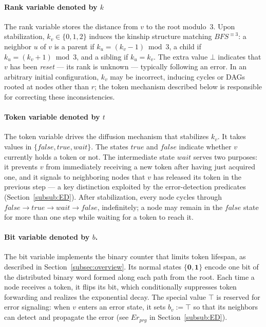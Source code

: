 \documentclass[a4paper, 12pt]{article}
\newcommand{\bz}{\mathbf{0}}
\newcommand{\bo}{\mathbf{1}}
\newcommand{\rk}{k}
\begin{document}
\paragraph*{Rank variable denoted by $\rk$}
The rank variable stores the distance from $v$ to the root modulo~$3$. Upon stabilization, $\rk_v \in \{0,1,2\}$ induces the kinship structure matching $BFS^{\equiv 3}$: a neighbor $u$ of $v$ is a parent if $\rk_u = (\rk_v - 1) \bmod 3$, a child if $\rk_u = (\rk_v + 1) \bmod 3$, and a sibling if $\rk_u = \rk_v$. The extra value $\bot$ indicates that $v$ has been \emph{reset} — its rank is unknown — typically following an error. In an arbitrary initial configuration, $\rk_v$ may be incorrect, inducing cycles or DAGs rooted at nodes other than $r$; the token mechanism described below is responsible for correcting these inconsistencies.

\paragraph*{Token variable denoted by $t$}
The token variable drives the diffusion mechanism that stabilizes $\rk_v$. It takes values in $\{\mathit{false}, \mathit{true}, \mathit{wait}\}$. The states $\mathit{true}$ and $\mathit{false}$ indicate whether $v$ currently holds a token or not. The intermediate state $\mathit{wait}$ serves two purposes: it prevents $v$ from immediately receiving a new token after having just acquired one, and it signals to neighboring nodes that $v$ has released its token in the previous step — a key distinction exploited by the error-detection predicates (Section~\ref{subsub:ED}). After stabilization, every node cycles through $\mathit{false} \to \mathit{true} \to \mathit{wait} \to \mathit{false}$, indefinitely; a node may remain in the $\mathit{false}$ state for more than one step while waiting for a token to reach it.

\paragraph*{Bit variable denoted by $b$.}
The bit variable implements the binary counter that limits token lifespan, as described in Section~\ref{subsec:overview}. Its normal states $\{\bz, \bo\}$ encode one bit of the distributed binary word formed along each path from the root. Each time a node receives a token, it flips its bit, which conditionally suppresses token forwarding and realizes the exponential decay. The special value $\top$ is reserved for error signaling: when $v$ enters an error state, it sets $b_v := \top$ so that its neighbors can detect and propagate the error (see $Er_{prg}$ in Section~\ref{subsub:ED}).
\end{document}
